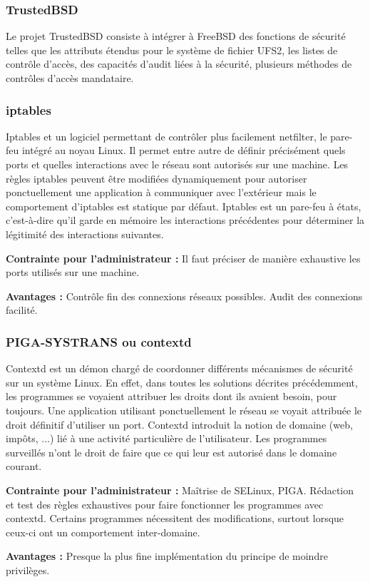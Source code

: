 \subsubsection{TrustedBSD}

Le projet TrustedBSD consiste à intégrer à FreeBSD des fonctions de sécurité telles que les attributs étendus pour le système de fichier UFS2, les listes de contrôle d'accès, des capacités d'audit liées à la sécurité, plusieurs méthodes de contrôles d'accès mandataire.

\subsubsection{iptables}

Iptables et un logiciel permettant de contrôler plus facilement netfilter, le pare-feu intégré au noyau Linux. Il permet entre autre de définir précisément quels ports et quelles interactions avec le réseau sont autorisés sur une machine. Les règles iptables peuvent être modifiées dynamiquement pour autoriser ponctuellement une application à communiquer avec l'extérieur mais le comportement d'iptables est statique par défaut. Iptables est un pare-feu à états, c'est-à-dire qu'il garde en mémoire les interactions précédentes pour déterminer la légitimité des interactions suivantes.
\begin{list}{}{}
 \item \textbf{Contrainte pour l'administrateur :} Il faut préciser de manière exhaustive les ports utilisés sur une machine.
 \item \textbf{Avantages :} Contrôle fin des connexions réseaux possibles. Audit des connexions facilité.
\end{list}

\subsubsection{PIGA-SYSTRANS ou contextd}

Contextd est un démon chargé de coordonner différents mécanismes de sécurité sur un système Linux. En effet, dans toutes les solutions décrites précédemment, les programmes se voyaient attribuer les droits dont ils avaient besoin, pour toujours. Une application utilisant ponctuellement le réseau se voyait attribuée le droit définitif d'utiliser un port. Contextd introduit la notion de domaine (web, impôts, ...) lié à une activité particulière de l'utilisateur. Les programmes surveillés n'ont le droit de faire que ce qui leur est autorisé dans le domaine courant.
\begin{list}{}{}
 \item \textbf{Contrainte pour l'administrateur :} Maîtrise de SELinux, PIGA. Rédaction et test des règles exhaustives pour faire fonctionner les programmes avec contextd. Certains programmes nécessitent des modifications, surtout lorsque ceux-ci ont un comportement inter-domaine.
 \item \textbf{Avantages :} Presque la plus fine implémentation du principe de moindre privilèges.
\end{list}

